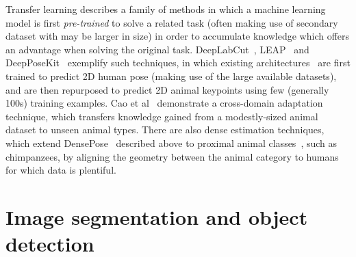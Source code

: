 Transfer learning describes a family of methods in which a machine learning model is first \emph{pre-trained} to solve a related task (often making use of secondary dataset with may be larger in size) in order to accumulate knowledge which offers an advantage when solving the original task. DeepLabCut~\cite{mathis2018deeplabcut}, LEAP~\cite{leap-animal-pose} and DeepPoseKit~\cite{graving2019deepposekit} exemplify such techniques, in which existing architectures~\cite{pishchulin2016deepcut,newell2016stacked,densenet,mobilenetv2} are first trained to predict 2D human pose (making use of the large available datasets), and are then repurposed to predict 2D animal keypoints using few (generally 100s) training examples. Cao et al~\cite{animalpose} demonstrate a cross-domain adaptation technique, which transfers knowledge gained from a modestly-sized animal dataset to unseen animal types. There are also dense estimation techniques, which extend DensePose~\cite{guler2018densepose} described above to proximal animal classes~\cite{DenseposeEvo20}, such as chimpanzees, by aligning the geometry between the animal category to humans for which data is plentiful.







\section{Image segmentation and object detection}

